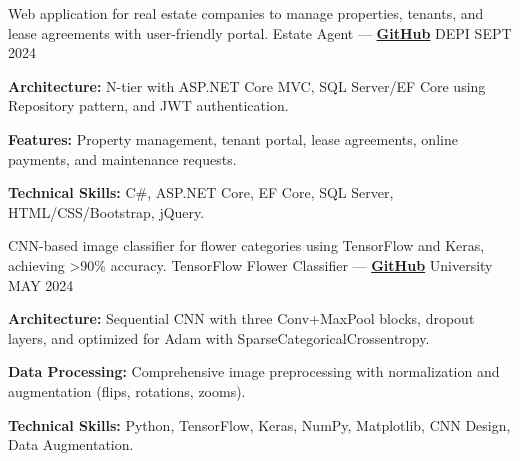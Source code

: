 \begin{cventries}
\cventry
    {Web application for real estate companies to manage properties, tenants, and lease agreements with user-friendly portal.} %
    {Estate Agent — \href{https://github.com/ibrhmahmd/RealEstate}{\color{midnightblue}\textbf{GitHub}} \textrm{\faArrowRight}} %
    {DEPI} %
    {SEPT 2024} %
    {
      \begin{cvitems} %
        \item \textbf{Architecture:}{ N-tier with ASP.NET Core MVC, SQL Server/EF Core using Repository pattern, and JWT authentication.}
        \item \textbf{Features:}{ Property management, tenant portal, lease agreements, online payments, and maintenance requests.}
        \item \textbf{Technical Skills:}{ C#, ASP.NET Core, EF Core, SQL Server, HTML/CSS/Bootstrap, jQuery.}
      \end{cvitems}
    }


\cventry
    {CNN-based image classifier for flower categories using TensorFlow and Keras, achieving >90\% accuracy.} %
    {TensorFlow Flower Classifier — \href{https://github.com/ibrhmahmd/Image-Recognition-using-TensorFlow}{\color{midnightblue}\textbf{GitHub}} \textrm{\faArrowRight}} %
    {University} %
    {MAY 2024} %
    {
      \begin{cvitems} %
        \item \textbf{Architecture:}{ Sequential CNN with three Conv+MaxPool blocks, dropout layers, and optimized for Adam with SparseCategoricalCrossentropy.}
        \item \textbf{Data Processing:}{ Comprehensive image preprocessing with normalization and augmentation (flips, rotations, zooms).}
        \item \textbf{Technical Skills:}{ Python, TensorFlow, Keras, NumPy, Matplotlib, CNN Design, Data Augmentation.}
      \end{cvitems}
    }
\end{cventries}


